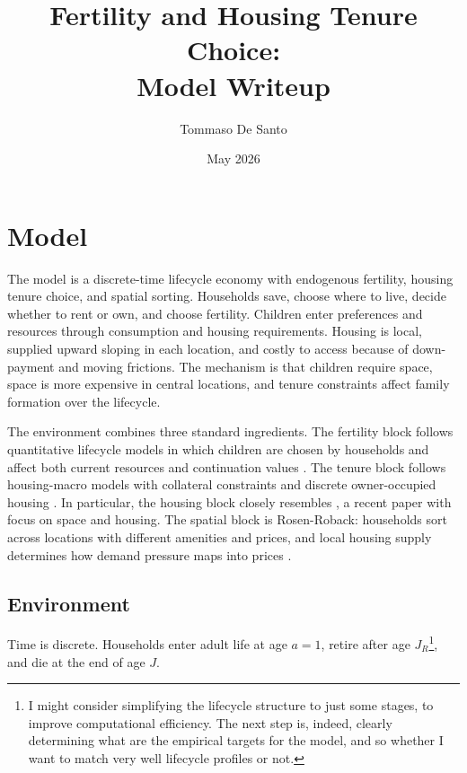 \documentclass[11pt]{article}
\title{Fertility and Housing Tenure Choice:\\Model Writeup}
\author{Tommaso De Santo}
\date{May 2026}
\begin{document}
\maketitle


\section{Model}

The model is a discrete-time lifecycle economy with endogenous fertility, housing tenure choice, and spatial sorting. Households save, choose where to live, decide whether to rent or own, and choose fertility. Children enter preferences and resources through consumption and housing requirements. Housing is local, supplied upward sloping in each location, and costly to access because of down-payment and moving frictions. The mechanism is that children require space, space is more expensive in central locations, and tenure constraints affect family formation over the lifecycle.

The environment combines three standard ingredients. The fertility block follows quantitative lifecycle models in which children are chosen by households and affect both current resources and continuation values \citep{sommerFertilityChoiceLife2016,doepkeBargainingBabiesTheory2019}. The tenure block follows housing-macro models with collateral constraints and discrete owner-occupied housing \citep{hendersonModelHousingTenure1983,sommerEquilibriumEffectFundamentals2013,sommerImplicationsUSTax2018}. In particular, the housing block closely resembles  \citet{greaneyDynamicUrbanEconomics2025}, a recent paper with focus on space and housing. The spatial block is Rosen-Roback: households sort across locations with different amenities and prices, and local housing supply determines how demand pressure maps into prices \citep{rosenWageBasedIndexes1979,robackWagesRentsQuality1982}.

\subsection{Environment}

Time is discrete. Households enter adult life at age $a=1$, retire after age $J_R$\footnote{I might consider simplifying the lifecycle structure to just some stages, to improve computational efficiency. The next step is, indeed, clearly determining what are the empirical targets for the model, and so whether I want to match very well lifecycle profiles or not.}, and die at the end of age $J$.
\end{document}

